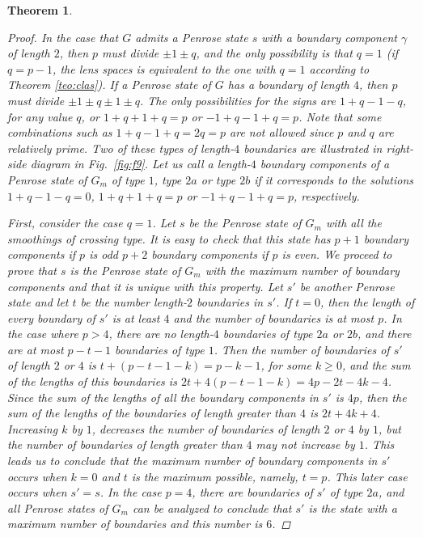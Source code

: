 \documentclass[pdflatex,sn-mathphys-num]{sn-jnl}%
\theoremstyle{plain}
\newtheorem{theorem}{Theorem}
\theoremstyle{definition}
\theoremstyle{remark}
\begin{document}
\begin{theorem}
\begin{proof}
In the case that $G$ admits a Penrose state $s$ with a boundary component $\gamma$ of length $2$, then $p$ must divide $\pm 1\pm q$, and the only possibility is that $q=1$ (if  $q=p-1$, the lens spaces is equivalent to the one with $q=1$ according to Theorem \ref{teo:clas}). If a Penrose state of $G$ has a boundary of length $4$, then $p$ must divide $\pm 1\pm q \pm 1 \pm q$. The only possibilities for the signs are $1+q-1-q$, for any value $q$, or $1+q+1+q=p$ or $-1+q-1+q=p$. Note that some combinations such as $1+q-1+q =2q=p$ are not allowed since $p$ and $q$ are relatively prime. Two of these types of length-$4$ boundaries are illustrated in right-side diagram in Fig.~\ref{fig:f9}. Let us call a length-$4$ boundary components of a Penrose state of $G_m$ of type $1$, type $2a$ or type $2b$ if it corresponds to the solutions  $1+q-1-q=0$, $1+q+1+q=p$ or $-1+q-1+q=p$, respectively.     

First, consider the case $q=1$. Let $s$ be the Penrose state of $G_m$ with all the smoothings of crossing type. It is easy to check that this state has $p+1$ boundary components if $p$ is odd  $p+2$ boundary components if $p$ is even. We proceed to prove that $s$ is the Penrose state of $G_m$ with the maximum number of boundary components and that it is unique with this property. Let $s'$ be another Penrose state and let $t$ be the number  length-$2$ boundaries in $s'$. If $t=0$, then the length of every boundary of $s'$ is at least $4$ and the number of boundaries is at most $p$. In the case where  $p>4$, there are no length-$4$ boundaries of type $2a$ or $2b$, and there are at most $p-t-1$ boundaries of type $1$. Then the number of boundaries of $s'$ of length $2$ or $4$ is $t+(p-t-1-k)=p-k-1$, for some $k\geq 0$, and the sum of the lengths of this boundaries is $2t+4(p-t-1-k)=4p-2t-4k-4$. Since the sum of the lengths of all the boundary components in $s'$ is $4p$, then the sum of the lengths of the boundaries of length greater than $4$ is $2t+4k+4$. Increasing $k$ by $1$, decreases the number of boundaries of length $2$ or $4$ by $1$, but the number of boundaries of length greater than $4$ may not increase by $1$. This leads us to conclude that the maximum number of boundary components in $s'$ occurs when $k=0$ and $t$ is the maximum possible, namely, $t=p$. This later case occurs  when $s'=s$. In the case $p=4$, there are boundaries of $s'$ of type $2a$, and all Penrose states of $G_m$ can be analyzed to conclude that $s'$ is the state with a maximum number of boundaries and this number is $6$. 


\end{proof}
\end{theorem}
\end{document}
